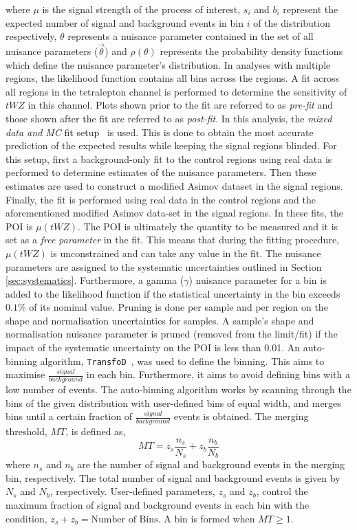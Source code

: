 where $\mu$ is the signal strength of the process of interest, $s_{i}$ and $b_{i}$ represent the expected number of signal and background events in bin $i$ of the distribution respectively, $\theta$ represents a nuisance parameter contained in the set of all nuisance parameters ($\vec{\theta}$) and $\rho(\theta)$ represents the probability density functions which define the nuisance parameter's distribution. In analyses with multiple regions, the likelihood function contains all bins across the regions. A fit across all regions in the tetralepton channel is performed to determine the sensitivity of $tWZ$ in this channel. Plots shown prior to the fit are referred to as \textit{pre-fit} and those shown after the fit are referred to as \textit{post-fit}. In this analysis, the \textit{mixed data and MC} fit setup~\cite{MixedDataAndMC_TRF} is used. This is done to obtain the most accurate prediction of the expected results while keeping the signal regions blinded. For this setup, first a background-only fit to the control regions using real data is performed to determine estimates of the nuisance parameters. Then these estimates are used to construct a modified Asimov dataset in the signal regions. Finally, the fit is performed using real data in the control regions and the aforementioned modified Asimov data-set in the signal regions. In these fits, the POI is $\mu (tWZ)$. The POI is ultimately the quantity to be measured and it is set as a \textit{free parameter} in the fit. This means that during the fitting procedure, $\mu (tWZ)$ is unconstrained and can take any value in the fit. The nuisance parameters are assigned to the systematic uncertainties outlined in Section \ref{sec:systematics}. Furthermore, a gamma ($\gamma$) nuisance parameter for a bin is added to the likelihood function if the statistical uncertainty in the bin exceeds $0.1\%$ of its nominal value. Pruning is done per sample and per region on the shape and normalisation uncertainties for samples. A sample's shape and normalisation nuisance parameter is pruned (removed from the limit/fit) if the impact of the systematic uncertainty on the POI is less than 0.01. An auto-binning algorithm, \texttt{TransfoD}~\cite{transfod-autobin, Calvet:2296985}, was used to define the binning. This aims to maximise $\frac{signal}{background}$ in each bin. Furthermore, it aims to avoid defining bins with a low number of events. The auto-binning algorithm works by scanning through the bins of the given distribution with user-defined bins of equal width, and merges bins until a certain fraction of $\frac{signal}{background}$ events is obtained. The merging threshold, $MT$, is defined as,
\begin{equation}
MT =  z_{s} \frac{n_{s}}{N_{s}} + z_{b} \frac{n_{b}}{N_{b}} 
\end{equation}
where $n_{s}$ and $n_{b}$ are the number of signal and background events in the merging bin, respectively. The total number of signal and background events is given by $N_{s}$ and $N_{b}$, respectively. User-defined parameters, $z_{s}$ and $z_{b}$, control the maximum fraction of signal and background events in each bin with the condition, $z_{s} + z_{b} = \text{Number of Bins}$. A bin is formed when $MT \geq 1$.\\

